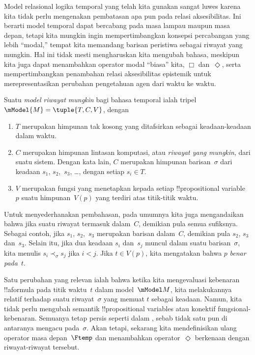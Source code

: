 \documentclass[../../../include/open-logic-section]{subfiles}
\begin{document}


Model relasional logika temporal yang telah kita gunakan sangat luwes karena
kita tidak perlu mengenakan pembatasan apa pun pada relasi aksesibilitas. Ini
berarti model temporal dapat bercabang pada masa lampau maupun masa depan,
tetapi kita mungkin ingin mempertimbangkan konsepsi percabangan yang lebih
``modal,'' tempat kita memandang barisan peristiwa sebagai riwayat yang
mungkin. Hal ini tidak mesti mengharuskan kita mengubah bahasa, meskipun kita
juga dapat menambahkan operator modal ``biasa'' kita, $\Box$ dan~$\Diamond$,
serta mempertimbangkan penambahan relasi aksesibilitas epistemik untuk
merepresentasikan perubahan pengetahuan agen dari waktu ke waktu.

\begin{defn}
  Suatu \emph{model riwayat mungkin} bagi bahasa temporal ialah tripel
  $\mModel{M}=\tuple{T,C,V}$, dengan
  \begin{enumerate}
    \item $T$ merupakan himpunan tak kosong yang ditafsirkan sebagai
      keadaan-keadaan dalam waktu.
    \item $C$ merupakan himpunan lintasan komputasi, atau \emph{riwayat yang
      mungkin}, dari suatu sistem. Dengan kata lain, $C$ merupakan himpunan
      barisan~$\sigma$ dari keadaan $s_1$, $s_2$,~$s_3$, \dots, dengan setiap
      $s_i\in T$.
    \item $V$ merupakan fungsi yang menetapkan kepada setiap !!{propositional
      variable}~$p$ suatu himpunan~$V(p)$ yang terdiri atas titik-titik waktu.
  \end{enumerate}
  Untuk menyederhanakan pembahasan, pada umumnya kita juga mengandaikan bahwa
  jika suatu riwayat termasuk dalam~$C$, demikian pula semua sufiksnya.
  Sebagai contoh, jika $s_1$, $s_2$,~$s_3$ merupakan barisan dalam~$C$,
  demikian pula $s_2$, $s_3$ dan~$s_3$.
  Selain itu, jika dua keadaan $s_i$ dan~$s_j$ muncul dalam suatu
  barisan~$\sigma$, kita menulis $s_i\prec_\sigma s_j$ jika $i<j$. Jika
  $t\in V(p)$, kita mengatakan bahwa $p$ \emph{benar pada}~$t$.
\end{defn}

Satu perubahan yang relevan ialah bahwa ketika kita mengevaluasi kebenaran
!!a{formula} pada titik waktu~$t$ dalam model~$\mModel M$, kita melakukannya
relatif terhadap suatu riwayat~$\sigma$ yang memuat $t$ sebagai keadaan.
Namun, kita tidak perlu mengubah semantik !!{propositional variable}s atau
konektif fungsional-kebenaran. Semuanya tetap persis seperti dalam
, sebab tidak satu pun di antaranya mengacu
pada~$\sigma$. Akan tetapi, sekarang kita mendefinisikan ulang operator masa
depan~$\Ftemp$ dan menambahkan operator~$\Diamond$ berkenaan dengan
riwayat-riwayat tersebut.
\end{document}
